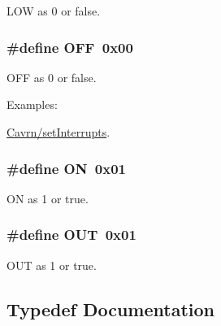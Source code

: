 L\-O\-W as 0 or false. 

\hypertarget{a00011_a29e413f6725b2ba32d165ffaa35b01e5}{
\subsubsection[{O\-F\-F}]{\setlength{\rightskip}{0pt plus 5cm}\#define O\-F\-F~0x00}}\label{a00011_a29e413f6725b2ba32d165ffaa35b01e5}


O\-F\-F as 0 or false. 

\begin{Desc}
\item[Examples\-: ]\par
\hyperlink{a00001}{Cavrn/set\-Interrupts}.\end{Desc}
\hypertarget{a00011_ad76d1750a6cdeebd506bfcd6752554d2}{
\subsubsection[{O\-N}]{\setlength{\rightskip}{0pt plus 5cm}\#define O\-N~0x01}}\label{a00011_ad76d1750a6cdeebd506bfcd6752554d2}


O\-N as 1 or true. 

\hypertarget{a00011_aec78e7a9e90a406a56f859ee456e8eae}{
\subsubsection[{O\-U\-T}]{\setlength{\rightskip}{0pt plus 5cm}\#define O\-U\-T~0x01}}\label{a00011_aec78e7a9e90a406a56f859ee456e8eae}


O\-U\-T as 1 or true. 



\subsection{Typedef Documentation}
\hypertarget{a00011_a82b52bf2b45e214a8f2100ebfdf1aee4}{
\subsubsection[{byte}]{}}\label{a00011_a82b52bf2b45e214a8f2100ebfdf1aee4}


